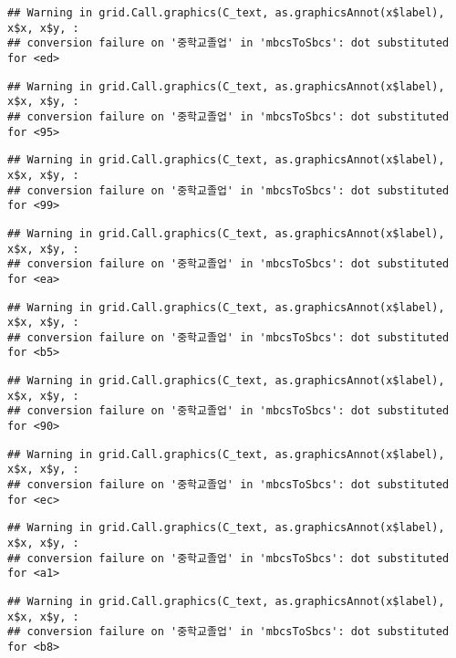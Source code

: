 \documentclass[
]{article}
\begin{document}
\begin{verbatim}
## Warning in grid.Call.graphics(C_text, as.graphicsAnnot(x$label), x$x, x$y, :
## conversion failure on '중학교졸업' in 'mbcsToSbcs': dot substituted for <ed>
\end{verbatim}

\begin{verbatim}
## Warning in grid.Call.graphics(C_text, as.graphicsAnnot(x$label), x$x, x$y, :
## conversion failure on '중학교졸업' in 'mbcsToSbcs': dot substituted for <95>
\end{verbatim}

\begin{verbatim}
## Warning in grid.Call.graphics(C_text, as.graphicsAnnot(x$label), x$x, x$y, :
## conversion failure on '중학교졸업' in 'mbcsToSbcs': dot substituted for <99>
\end{verbatim}

\begin{verbatim}
## Warning in grid.Call.graphics(C_text, as.graphicsAnnot(x$label), x$x, x$y, :
## conversion failure on '중학교졸업' in 'mbcsToSbcs': dot substituted for <ea>
\end{verbatim}

\begin{verbatim}
## Warning in grid.Call.graphics(C_text, as.graphicsAnnot(x$label), x$x, x$y, :
## conversion failure on '중학교졸업' in 'mbcsToSbcs': dot substituted for <b5>
\end{verbatim}

\begin{verbatim}
## Warning in grid.Call.graphics(C_text, as.graphicsAnnot(x$label), x$x, x$y, :
## conversion failure on '중학교졸업' in 'mbcsToSbcs': dot substituted for <90>
\end{verbatim}

\begin{verbatim}
## Warning in grid.Call.graphics(C_text, as.graphicsAnnot(x$label), x$x, x$y, :
## conversion failure on '중학교졸업' in 'mbcsToSbcs': dot substituted for <ec>
\end{verbatim}

\begin{verbatim}
## Warning in grid.Call.graphics(C_text, as.graphicsAnnot(x$label), x$x, x$y, :
## conversion failure on '중학교졸업' in 'mbcsToSbcs': dot substituted for <a1>
\end{verbatim}

\begin{verbatim}
## Warning in grid.Call.graphics(C_text, as.graphicsAnnot(x$label), x$x, x$y, :
## conversion failure on '중학교졸업' in 'mbcsToSbcs': dot substituted for <b8>
\end{verbatim}
\end{document}
